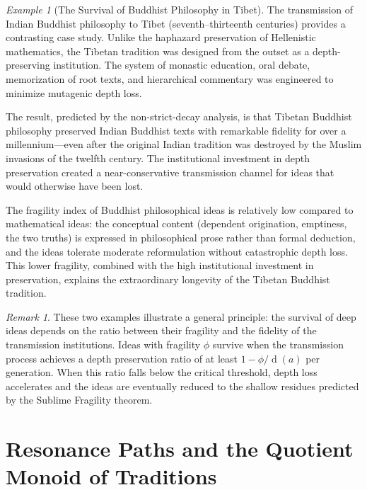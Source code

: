 \documentclass[11pt,openany]{book}
\theoremstyle{definition}
\theoremstyle{plain}
\theoremstyle{remark}
\newtheorem{remark}[axiom]{Remark}
\newtheorem{example}[axiom]{Example}
\newcommand{\depth}{\operatorname{d}}       %
\begin{document}
\begin{example}[The Survival of Buddhist Philosophy in Tibet]
The transmission of Indian Buddhist philosophy to Tibet (seventh--thirteenth centuries) provides a contrasting case study. Unlike the haphazard preservation of Hellenistic mathematics, the Tibetan tradition was designed from the outset as a depth-preserving institution. The system of monastic education, oral debate, memorization of root texts, and hierarchical commentary was engineered to minimize mutagenic depth loss.

The result, predicted by the non-strict-decay analysis, is that Tibetan Buddhist philosophy preserved Indian Buddhist texts with remarkable fidelity for over a millennium---even after the original Indian tradition was destroyed by the Muslim invasions of the twelfth century. The institutional investment in depth preservation created a near-conservative transmission channel for ideas that would otherwise have been lost.

The fragility index of Buddhist philosophical ideas is relatively low compared to mathematical ideas: the conceptual content (dependent origination, emptiness, the two truths) is expressed in philosophical prose rather than formal deduction, and the ideas tolerate moderate reformulation without catastrophic depth loss. This lower fragility, combined with the high institutional investment in preservation, explains the extraordinary longevity of the Tibetan Buddhist tradition.
\end{example}

\begin{remark}
These two examples illustrate a general principle: the survival of deep ideas depends on the ratio between their fragility and the fidelity of the transmission institutions. Ideas with fragility $\phi$ survive when the transmission process achieves a depth preservation ratio of at least $1 - \phi/\depth(a)$ per generation. When this ratio falls below the critical threshold, depth loss accelerates and the ideas are eventually reduced to the shallow residues predicted by the Sublime Fragility theorem.
\end{remark}

\chapter{Resonance Paths and the Quotient Monoid of Traditions}
\label{ch:resonance-paths}
\end{document}
